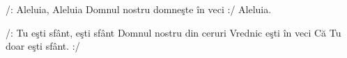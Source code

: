 
\beginverse
/: Aleluia, Aleluia
Domnul nostru domneşte în veci :/
Aleluia.
\endverse

\beginchorus
/: Tu eşti sfânt, eşti sfânt
Domnul nostru din ceruri
Vrednic eşti în veci
Că Tu doar eşti sfânt. :/
\endchorus

\endsong